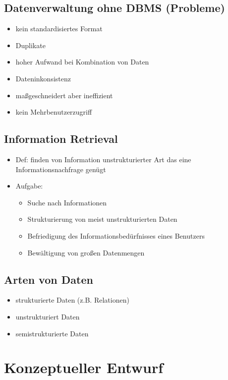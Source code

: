 \documentclass[a4paper]{article}
\begin{document}
\subsection{Datenverwaltung ohne DBMS (Probleme)}
\begin{itemize}
    \item kein standardisiertes Format
    \item Duplikate
    \item hoher Aufwand bei Kombination von Daten
    \item Dateninkonsistenz
    \item maßgeschneidert aber ineffizient
    \item kein Mehrbenutzerzugriff
\end{itemize}

\newpage

\subsection{Information Retrieval}
\begin{itemize}
    \item Def: finden von Information unstrukturierter Art das eine Informationsnachfrage genügt
    \item Aufgabe:
    \begin{itemize}
        \item Suche nach Informationen
        \item Strukturierung von meist unstrukturierten Daten
        \item Befriedigung des Informationsbedürfnisses eines Benutzers
        \item Bewältigung von großen Datenmengen
    \end{itemize}
\end{itemize}

\subsection{Arten von Daten}
\begin{itemize}
    \item strukturierte Daten (z.B. Relationen)
    \item unstrukturiert Daten 
    \item semistrukturierte Daten
\end{itemize}

\newpage

\section{Konzeptueller Entwurf}
\end{document}
